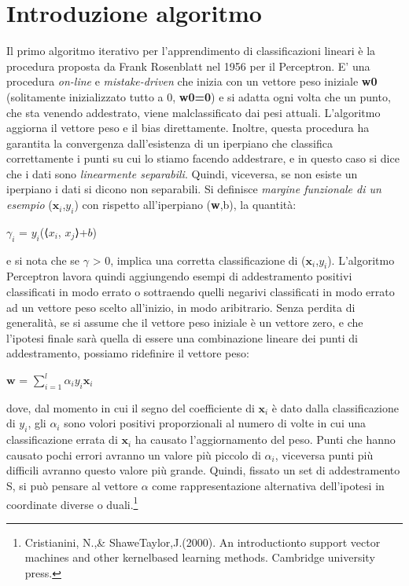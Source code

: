 \documentclass{article}
\begin{document}
	\section{Introduzione algoritmo}
	Il primo algoritmo iterativo per l'apprendimento di classificazioni lineari è la procedura proposta da Frank Rosenblatt nel 1956 per il Perceptron. E' una procedura \textit{on-line} e \textit{mistake-driven}
	che inizia con un vettore peso iniziale \textbf{w0} (solitamente inizializzato tutto a 0, \textbf{w0=0}) e si adatta ogni volta che un punto, che sta venendo addestrato, viene malclassificato dai pesi attuali.
	L'algoritmo aggiorna il vettore peso e il bias direttamente. Inoltre, questa procedura ha garantita la convergenza dall'esistenza di un iperpiano che classifica correttamente i punti su cui lo stiamo facendo addestrare, e in questo
	caso si dice che i dati sono \textit{linearmente separabili}. Quindi, viceversa, se non esiste un iperpiano i dati si dicono non separabili. Si definisce \textit{margine funzionale di un esempio} ({$\textbf{x}_i$},$y_i$) con rispetto all'iperpiano (\textbf{w},b), la quantità:
	\begin{center}
		$\gamma_i$ = $y_i$(⟨$x_i$, $x_j$⟩+$b$) 
	\end{center}
	e si nota che se $\gamma$ > 0, implica una corretta classificazione di ({$\textbf{x}_i$},$y_i$).
	L'algoritmo Perceptron lavora quindi aggiungendo esempi di addestramento positivi classificati in modo errato o sottraendo quelli negarivi classificati in modo errato ad un vettore peso scelto all'inizio, in modo aribitrario.
	Senza perdita di generalità, se si assume che il vettore peso iniziale è un vettore zero, e che l'ipotesi finale sarà quella di essere una combinazione lineare dei punti di addestramento, possiamo ridefinire il vettore peso: 
	\begin{center}
		$\textbf{w}$ = $\displaystyle\sum_{i=1}^l \alpha_iy_i\textbf{x}_i$
	\end{center}
	dove, dal momento in cui il segno del coefficiente di $\textbf{x}_i$ è dato dalla classificazione di $y_i$, gli $\alpha_i$ sono volori positivi proporzionali al numero di volte in cui una classificazione errata di $\textbf{x}_i$ ha causato l'aggiornamento del peso.
	Punti che hanno causato pochi errori avranno un valore più piccolo di $\alpha_i$, viceversa punti più difficili avranno questo valore più grande.
	Quindi, fissato un set di addestramento S, si può pensare al vettore \textbf{$\alpha$} come rappresentazione alternativa dell'ipotesi in coordinate diverse o duali.\footnote[1]{Cristianini, N.,\& Shawe\-Taylor,J.(2000). An introductionto support vector machines and other kernel\-based learning methods. Cambridge university press.}
\end{document}
